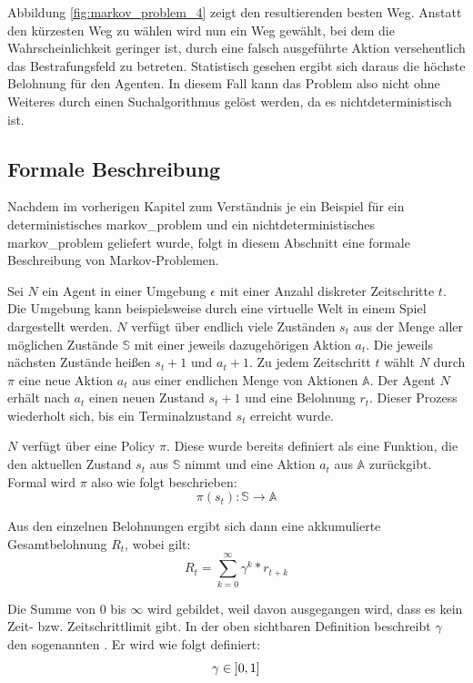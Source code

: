 Abbildung \ref{fig:markov_problem_4} zeigt den resultierenden besten Weg. Anstatt den kürzesten Weg zu wählen wird nun ein Weg gewählt, bei dem die Wahrscheinlichkeit geringer ist, durch eine falsch ausgeführte Aktion versehentlich das Bestrafungsfeld zu betreten. Statistisch gesehen ergibt sich daraus die höchste Belohnung für den Agenten. In diesem Fall kann das Problem also nicht ohne Weiteres durch einen Suchalgorithmus gelöst werden, da es nichtdeterministisch ist.



\subsection{Formale Beschreibung}
Nachdem im vorherigen Kapitel zum Verständnis je ein Beispiel für ein deterministisches \ac{markov_problem} und ein nichtdeterministisches \ac{markov_problem} geliefert wurde, folgt in diesem Abschnitt eine formale Beschreibung von Markov-Problemen.


Sei $N$ ein Agent in einer Umgebung $\epsilon$ mit einer Anzahl diskreter Zeitschritte $t$. Die Umgebung kann beispielsweise durch eine virtuelle Welt in einem Spiel dargestellt werden. $N$ verfügt über endlich viele Zuständen $s_t$ aus der Menge aller möglichen Zustände $\mathbb{S}$ mit einer jeweils dazugehörigen Aktion $a_t$. Die jeweils nächsten Zustände heißen $s_t+1$ und $a_t+1$. Zu jedem Zeitschritt $t$ wählt $N$ durch $\pi$ eine neue Aktion $a_t$ aus einer endlichen Menge von Aktionen $\mathbb{A}$. Der Agent $N$ erhält nach $a_t$ einen neuen Zustand $s_t+1$ und eine Belohnung $r_t$. Dieser Prozess wiederholt sich, bis ein  Terminalzustand $s_t$ erreicht wurde.

$N$ verfügt über eine Policy $\pi$. Diese wurde bereits definiert als eine Funktion, die den aktuellen Zustand $s_t$ aus $\mathbb{S}$ nimmt und eine Aktion $a_t$ aus $\mathbb{A}$ zurückgibt. Formal wird $\pi$ also wie folgt beschrieben:
$$ \pi(s_t) : \mathbb{S} \rightarrow \mathbb{A} $$

Aus den einzelnen Belohnungen ergibt sich dann eine akkumulierte Gesamtbelohnung $R_t$, wobei gilt:
$$   R_t   =   \sum_{k=0}^{\infty} {\gamma^k * r_{t+k}}   $$

Die Summe von $0$ bis $\infty$ wird gebildet, weil davon ausgegangen wird, dass es kein Zeit- bzw. Zeitschrittlimit gibt. In der oben sichtbaren Definition beschreibt $\gamma$ den sogenannten . Er wird wie folgt definiert:
$$ \gamma \in \interval[open left]{0}{1} $$

